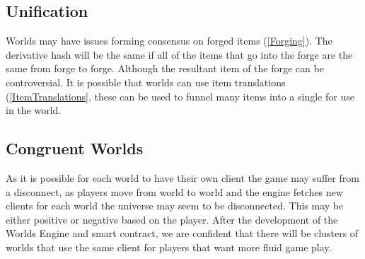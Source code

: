 \documentclass[runningheads,a4paper]{llncs}
\begin{document}
\subsection{Unification}
Worlds may have issues forming consensus on forged items (\ref{Forging}). The derivative hash will be the same if all of the items that go into the forge are the same from forge to forge. Although the resultant item of the forge can be controversial. It is possible that worlds can use item translations (\ref{ItemTranslations}, these can be used to funnel many items into a single for use in the world.

\subsection{Congruent Worlds}
As it is possible for each world to have their own client the game may suffer from a disconnect, as players move from world to world and the engine fetches new clients for each world the universe may seem to be disconnected. This may be either positive or negative based on the player. After the development of the Worlds Engine and smart contract, we are confident that there will be clusters of worlds that use the same client for players that want more fluid game play.
\end{document}

